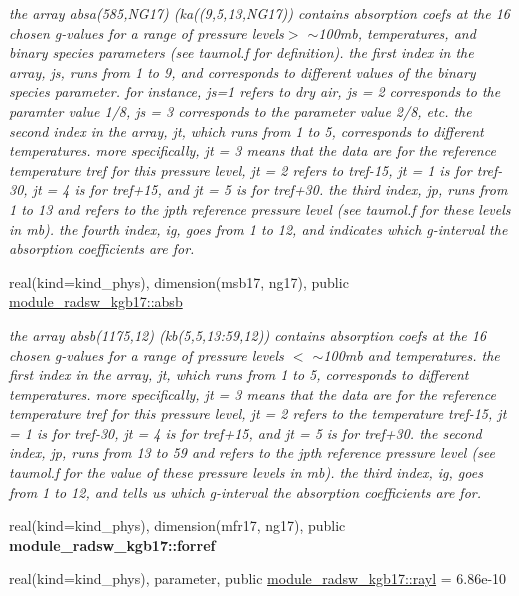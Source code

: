 \begin{Indent}
\begin{DoxyCompactItemize}
\begin{DoxyCompactList}\small\item\em the array absa(585,\+N\+G17) (ka((9,5,13,\+N\+G17)) contains absorption coefs at the 16 chosen g-\/values for a range of pressure levels$>$ $\sim$100mb, temperatures, and binary species parameters (see taumol.\+f for definition). the first index in the array, js, runs from 1 to 9, and corresponds to different values of the binary species parameter. for instance, js=1 refers to dry air, js = 2 corresponds to the paramter value 1/8, js = 3 corresponds to the parameter value 2/8, etc. the second index in the array, jt, which runs from 1 to 5, corresponds to different temperatures. more specifically, jt = 3 means that the data are for the reference temperature tref for this pressure level, jt = 2 refers to tref-\/15, jt = 1 is for tref-\/30, jt = 4 is for tref+15, and jt = 5 is for tref+30. the third index, jp, runs from 1 to 13 and refers to the jpth reference pressure level (see taumol.\+f for these levels in mb). the fourth index, ig, goes from 1 to 12, and indicates which g-\/interval the absorption coefficients are for. \end{DoxyCompactList}\item 
real(kind=kind\+\_\+phys), dimension(msb17, ng17), public \hyperlink{group__module__radsw__kgbnn_gaef407d13a88f5e1bfd20652ab3010e2f}{module\+\_\+radsw\+\_\+kgb17\+::absb}
\begin{DoxyCompactList}\small\item\em the array absb(1175,12) (kb(5,5,13\+:59,12)) contains absorption coefs at the 16 chosen g-\/values for a range of pressure levels $<$ $\sim$100mb and temperatures. the first index in the array, jt, which runs from 1 to 5, corresponds to different temperatures. more specifically, jt = 3 means that the data are for the reference temperature tref for this pressure level, jt = 2 refers to the temperature tref-\/15, jt = 1 is for tref-\/30, jt = 4 is for tref+15, and jt = 5 is for tref+30. the second index, jp, runs from 13 to 59 and refers to the jpth reference pressure level (see taumol.\+f for the value of these pressure levels in mb). the third index, ig, goes from 1 to 12, and tells us which g-\/interval the absorption coefficients are for. \end{DoxyCompactList}\item 
real(kind=kind\+\_\+phys), dimension(mfr17, ng17), public {\bfseries module\+\_\+radsw\+\_\+kgb17\+::forref}
\item 
real(kind=kind\+\_\+phys), parameter, public \hyperlink{group__module__radsw__kgbnn_gaa4862628a06e0e08d1db5637bc62ffa5}{module\+\_\+radsw\+\_\+kgb17\+::rayl} = 6.\+86e-\/10

\end{DoxyCompactItemize}
\end{Indent}

